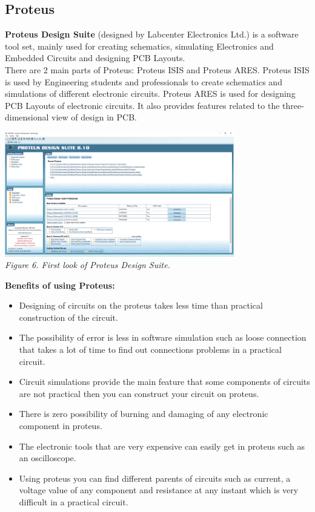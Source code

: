 \documentclass[a4paper]{article}
\begin{document}
\subsection{Proteus}
\textbf{Proteus Design Suite} (designed by Labcenter Electronics Ltd.) is a software tool set, mainly used for creating schematics, simulating Electronics and Embedded Circuits and designing PCB Layouts.\bigskip\\
There are 2 main parts of Proteus: Proteus ISIS and Proteus ARES. Proteus ISIS is used by Engineering students and professionals to create schematics and simulations of different electronic circuits. Proteus ARES is used for designing PCB Layouts of electronic circuits. It also provides features related to the three-dimensional view of design in PCB.
\medskip
\begin{center}
    \includegraphics[width=10cm]{pictures/6.png}\\
    \textit{Figure 6. First look of Proteus Design Suite.}\\
\end{center}
\medskip
\textbf{Benefits of using Proteus:}
\begin{itemize}
    \item Designing of circuits on the proteus takes less time than practical construction of the circuit.
    \item The possibility of error is less in software simulation such as loose connection that takes a lot of time to find out connections problems in a practical circuit.
    \item Circuit simulations provide the main feature that some components of circuits are not practical then you can construct your circuit on proteus.
    \item There is zero possibility of burning and damaging of any electronic component in proteus.
    \item The electronic tools that are very expensive can easily get in proteus such as an oscilloscope.
    \item Using proteus you can find different parents of circuits such as current, a voltage value of any component and resistance at any instant which is very difficult in a practical circuit.
\end{itemize}
\medskip
\end{document}

